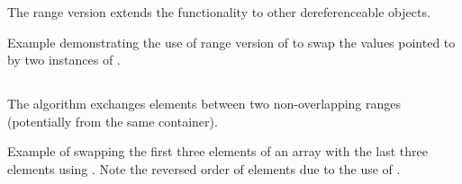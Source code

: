 The range version extends the functionality to other dereferenceable objects.

\begin{box-note}
\footnotesize Example demonstrating the use of range version of  to swap the values pointed to by two instances of .
\tcblower
{}
\end{box-note}

\subsection{\texorpdfstring{}{\texttt{std::swap\_ranges}}}

The  algorithm exchanges elements between two non-overlapping ranges (potentially from the same container).


\begin{box-note}
\footnotesize Example of swapping the first three elements of an array with the last three elements using . Note the reversed order of elements due to the use of .
\tcblower
{}
\end{box-note}